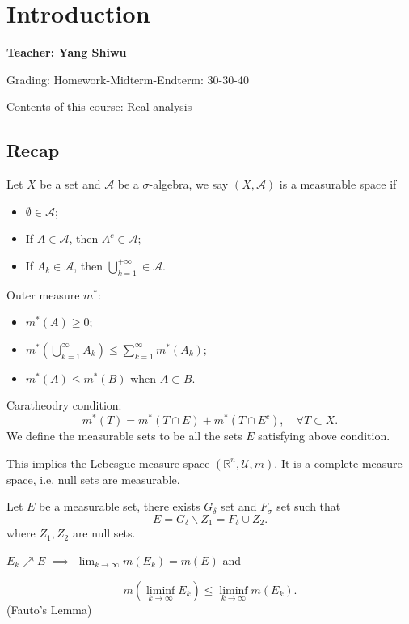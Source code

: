 \section{Introduction}
\label{sec:Introduction}
\begin{center}
	\bfseries Teacher: Yang Shiwu
\end{center}

Grading: Homework-Midterm-Endterm: 30-30-40

Contents of this course: Real analysis

\subsection{Recap}
\label{sub:Recap}
\begin{definition}
	Let $X$ be a set and $\mathcal{A}$ be a $\sigma$-algebra,
	we say  $(X, \mathcal{A})$ is a measurable space if
	\begin{itemize}
		\item $\emptyset \in \mathcal{A}$;
		\item If $A\in \mathcal{A}$, then $A^c\in \mathcal{A}$;
		\item If  $A_k\in \mathcal{A}$, then $\bigcup_{k=1}^{+\infty } \in \mathcal{A}$.
	\end{itemize}
\end{definition}

Outer measure $m^*$:
\begin{itemize}
	\item $m^*(A)\ge 0$;
	\item  $m^*(\bigcup_{k=1}^{\infty }A_k)\le \sum_{k=1}^{\infty} m^*(A_k)$;
	\item $m^*(A)\le m^*(B)$ when $A\subset B$.
\end{itemize}

Caratheodry condition:
\[
m^*(T) = m^*(T \cap E) + m^*(T \cap E^c),\quad \forall T \subset X
.\]
We define the measurable sets to be all the sets $E$ satisfying above condition.

This implies the Lebesgue measure space $(\mathbb{R}^n, \mathscr{U}, m)$.
It is a complete measure space, i.e. null sets are measurable.

\begin{proposition}
	Let $E$ be a measurable set, there exists $G_{\delta}$ set and  $F_{\sigma}$ set
	such that
	 \[
		 E = G_{\delta}\backslash Z_1 = F_{\delta} \cup Z_2
	.\]
	where $Z_1,Z_2$ are null sets.

	$E_k\nearrow E$  $\implies$  $ \lim_{k \to \infty}m(E_k) = m(E)$ and

	 \[
		 m\left(\liminf_{k\to \infty}E_k\right)\le \liminf_{k\to \infty}m(E_k)
	.\]
	(Fauto's Lemma)
\end{proposition}

